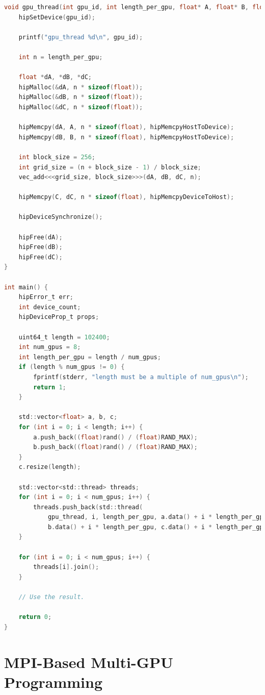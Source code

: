 \begin{lstlisting}[language=C, caption={用執行緒設計多GPU程式}, captionpos=t, label={lst:multGPUs_threads}]
void gpu_thread(int gpu_id, int length_per_gpu, float* A, float* B, float* C) {
    hipSetDevice(gpu_id);
    
    printf("gpu_thread %d\n", gpu_id);
    
    int n = length_per_gpu;
    
    float *dA, *dB, *dC;
    hipMalloc(&dA, n * sizeof(float));
    hipMalloc(&dB, n * sizeof(float));
    hipMalloc(&dC, n * sizeof(float));
    
    hipMemcpy(dA, A, n * sizeof(float), hipMemcpyHostToDevice);
    hipMemcpy(dB, B, n * sizeof(float), hipMemcpyHostToDevice);
    
    int block_size = 256;
    int grid_size = (n + block_size - 1) / block_size;
    vec_add<<<grid_size, block_size>>>(dA, dB, dC, n);
    
    hipMemcpy(C, dC, n * sizeof(float), hipMemcpyDeviceToHost);
    
    hipDeviceSynchronize();
    
    hipFree(dA);
    hipFree(dB);
    hipFree(dC);
}

int main() {
    hipError_t err;
    int device_count;
    hipDeviceProp_t props;
    
    uint64_t length = 102400;
    int num_gpus = 8;
    int length_per_gpu = length / num_gpus;
    if (length % num_gpus != 0) {
        fprintf(stderr, "length must be a multiple of num_gpus\n");
        return 1;
    }
    
    std::vector<float> a, b, c;
    for (int i = 0; i < length; i++) {
        a.push_back((float)rand() / (float)RAND_MAX);
        b.push_back((float)rand() / (float)RAND_MAX);
    }
    c.resize(length);
    
    std::vector<std::thread> threads;
    for (int i = 0; i < num_gpus; i++) {
        threads.push_back(std::thread(
            gpu_thread, i, length_per_gpu, a.data() + i * length_per_gpu,
            b.data() + i * length_per_gpu, c.data() + i * length_per_gpu));
    }
    
    for (int i = 0; i < num_gpus; i++) {
        threads[i].join();
    }
    
    // Use the result.
    
    return 0;
}
\end{lstlisting}

\section{MPI-Based Multi-GPU Programming}

